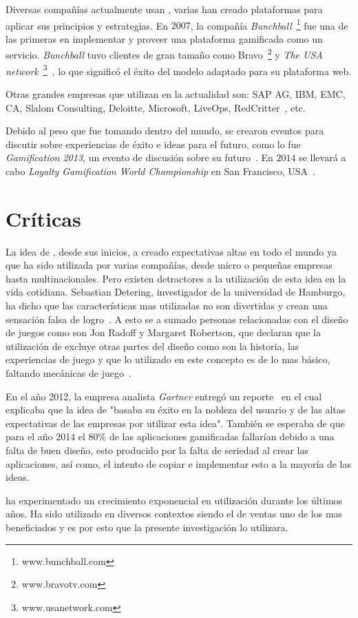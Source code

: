 Diversas compañías actualmente usan {\GAM}, varias han creado plataformas para
aplicar sus principios y estrategias.
En $2007$, la compañía \emph{Bunchball}~\footnote{www.bunchball.com} fue una de
las primeras en implementar y proveer una plataforma gamificada como un
servicio\cite{Gam:Bunchball:1}.
\emph{Bunchball} tuvo clientes de gran tamaño como Bravo~\footnote{www.bravotv.com}
y \emph{The USA network}~\footnote{www.usanetwork.com}~\cite{Gam:Bunchball:2},
lo que significó el éxito del modelo adaptado para su plataforma web.

Otras grandes empresas que utilizan {\GAM} en la actualidad son:
SAP AG, IBM, EMC, CA, Slalom Consulting, Deloitte, Microsoft, LiveOps,
RedCritter~\cite{Gam:Companies:1}, etc.

Debido al peso que {\GAM} fue tomando dentro del mundo,
se crearon eventos para discutir sobre experiencias de éxito e ideas para
el futuro, como lo fue \emph{Gamification 2013},
un evento de discusión sobre su futuro~\cite{Gam:Events:1}.
En $2014$ se llevará a cabo \emph{Loyalty Gamification World Championship}
en San Francisco, USA~\cite{Gam:Events:2}.

\section{Críticas}

La idea de {\GAM}, desde sus inicios, a creado expectativas altas en todo el mundo
ya que ha sido utilizada por varias compañías, desde micro o pequeñas empresas
hasta multinacionales.
Pero existen detractores a la utilización de esta idea en la vida cotidiana.
Sebastian Detering, investigador de la universidad de Hamburgo, ha dicho que las
características mas utilizadas no son divertidas y crean una sensación falsa de
logro~\cite{Gam:Crit:1}.
A esto se a sumado personas relacionadas con el diseño de juegos como son
Jon Radoff y Margaret Robertson,  que declaran que la utilización de {\GAM}
excluye otras partes del diseño como son la historia, las experiencias de juego
y que lo utilizado en este concepto es de lo mas básico, faltando mecánicas de
juego~\cite{Gam:Crit:2}.

En el año 2012, la empresa analista \emph{Gartner} entregó un
reporte~\cite{Gam:Crit:3} en el cual explicaba que la idea de {\GAM}
"basaba su éxito en la nobleza del usuario y de las altas expectativas
de las empresas por utilizar esta idea".
También se esperaba de que para el año 2014 el 80\% de las aplicaciones
gamificadas fallarían debido a una falta de buen diseño,
esto producido por la falta de seriedad al crear las aplicaciones,
así como, el intento de copiar e implementar esto a la mayoría de las ideas.

{\GAM} ha experimentado un crecimiento exponencial en utilización durante los últimos 
años. Ha sido utilizado en diversos contextos siendo el de ventas uno de los mas beneficiados
 y es por esto que la presente investigación lo utilizara.
